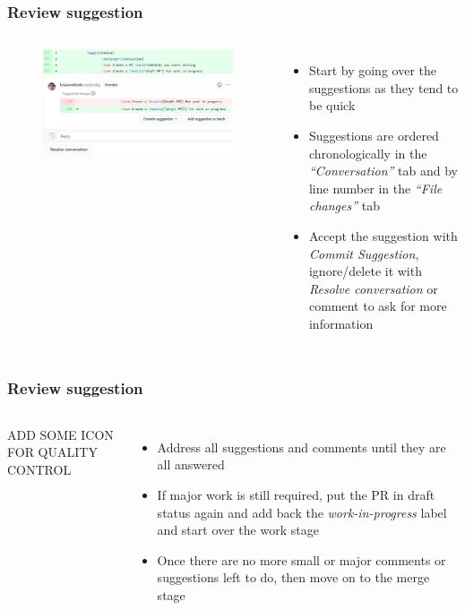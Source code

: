\documentclass[aspectratio=169]{beamer} %
\begin{document}
\begin{frame}
	\frametitle{Review suggestion}
	\begin{columns}[c]

		\vspace{-.75cm}
		\begin{figure}
			\centering
			\includegraphics[width=\textwidth]{./img/review-suggestion-1.png}
		\end{figure}

		\begin{itemize}
			\setlength\itemsep{1em}
			\item Start by going over the suggestions as they tend to be quick
			\item Suggestions are ordered chronologically in the \textit{``Conversation''} tab and by line number in the \textit{``File changes''} tab
			\item Accept the suggestion with \textit{Commit Suggestion}, ignore/delete it with \textit{Resolve conversation} or comment to ask for more information
		\end{itemize}

	\end{columns}
\end{frame}

\begin{frame}
	\frametitle{Review suggestion}
	\begin{columns}[c]

		\Large ADD SOME ICON FOR QUALITY CONTROL

		\begin{itemize}
			\setlength\itemsep{1em}
			\item Address all suggestions and comments until they are all answered
			\item If major work is still required, put the PR in draft status again and add back the \textit{work-in-progress} label and start over the work stage
			\item Once there are no more small or major comments or suggestions left to do, then move on to the merge stage
		\end{itemize}

	\end{columns}
\end{frame}
\end{document}
